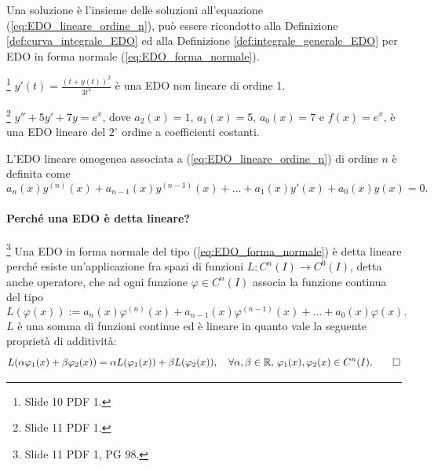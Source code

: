 Una soluzione è l'insieme delle soluzioni all'equazione (\ref{eq:EDO_lineare_ordine_n}), può essere ricondotto alla Definizione \ref{def:curva_integrale_EDO} ed alla Definizione \ref{def:integrale_generale_EDO} per EDO in forma normale (\ref{eq:EDO_forma_normale}).

\begin{example}
    \footnote{Slide 10 PDF 1.} $y'(t)=\frac{(t+y(t))^2}{3t^2}$ è una EDO non lineare di ordine 1. 
\end{example}

\begin{example}
    \footnote{Slide 11 PDF 1.} $y''+5y'+7y=e^x$, dove $a_2(x)=1,\, a_1(x)=5,\, a_0(x)=7$ e $f(x)=e^x$, è una EDO lineare del $2^\circ$ ordine a coefficienti costanti.
\end{example}

\begin{definition}\label{def:EDO_lineare_omogenea_ordine_n}
    L'EDO lineare omogenea associata a (\ref{eq:EDO_lineare_ordine_n}) di ordine $n$ è definita come
    \begin{equation}\label{eq:EDO_lineare_omogenea_associata_ordine_n}
        a_n(x)y^{(n)}(x)+a_{n-1}(x)y^{(n-1)}(x)+\hdots+a_1(x)y'(x)+a_0(x)y(x)=0.
    \end{equation}
\end{definition}

\paragraph{Perché una EDO è detta lineare?} \footnote{Slide 11 PDF 1, PG 98.} Una EDO in forma normale del tipo (\ref{eq:EDO_forma_normale}) è detta lineare perché esiste un'applicazione fra spazi di funzioni $L\colon C^n(I)\rightarrow C^0(I)$, detta anche operatore, che ad ogni funzione $\varphi\in C^n(I)$ associa la funzione continua del tipo
\begin{equation*}
    L(\varphi(x)):=a_n(x)\varphi^{(n)}(x)+a_{n-1}(x)\varphi^{(n-1)}(x)+\hdots+a_0(x)\varphi(x).
\end{equation*}
$L$ è una somma di funzioni continue ed è lineare in quanto vale la seguente proprietà di additività:
\begin{equation*}
    L(\alpha\varphi_1(x)+\beta\varphi_2(x))=\alpha L(\varphi_1(x)) + \beta L(\varphi_2(x)),\quad\forall \alpha,\beta\in\mathbb R,\, \varphi_1(x),\varphi_2(x)\in C^n(I). \qed
\end{equation*}

